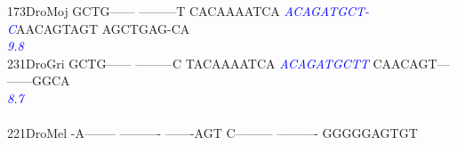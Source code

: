\documentclass[11pt,twoside,reqno,a4paper]{article}
\begin{document}
{173\hspace*{1\charwidth}DroMoj	GCTG------	---------T	CACAAAATCA	\textit{\textcolor{Blue}{A}}\textit{\textcolor{Blue}{C}}\textit{\textcolor{Blue}{A}}\textit{\textcolor{Blue}{G}}\textit{\textcolor{Blue}{A}}\textit{\textcolor{Blue}{T}}\textit{\textcolor{Blue}{G}}\textit{\textcolor{Blue}{C}}\textit{\textcolor{Blue}{T}}\textit{\textcolor{Blue}{-}}	\textit{\textcolor{Blue}{C}}AACAGTAGT	AGCTGAG-CA	\\
\hspace*{4\charwidth}\hspace*{7\charwidth}\hspace*{1\charwidth}\hspace*{1\charwidth}\hspace*{1\charwidth}\hspace*{30\charwidth}\textit{\textcolor{Blue}{9.8}}\hspace*{1\charwidth}\hspace*{1\charwidth}\hspace*{1\charwidth}\\
231\hspace*{1\charwidth}DroGri	GCTG------	---------C	TACAAAATCA	\textit{\textcolor{Blue}{A}}\textit{\textcolor{Blue}{C}}\textit{\textcolor{Blue}{A}}\textit{\textcolor{Blue}{G}}\textit{\textcolor{Blue}{A}}\textit{\textcolor{Blue}{T}}\textit{\textcolor{Blue}{G}}\textit{\textcolor{Blue}{C}}\textit{\textcolor{Blue}{T}}\textit{\textcolor{Blue}{T}}	CAACAGT---	------GGCA	\\
\hspace*{4\charwidth}\hspace*{7\charwidth}\hspace*{1\charwidth}\hspace*{1\charwidth}\hspace*{1\charwidth}\hspace*{30\charwidth}\textit{\textcolor{Blue}{8.7}}\hspace*{1\charwidth}\hspace*{1\charwidth}\hspace*{1\charwidth}\\
\\
221\hspace*{1\charwidth}DroMel	-A--------	----------	-------AGT	C---------	----------	GGGGGAGTGT	\\
\hspace*{4\charwidth}\hspace*{7\charwidth}\hspace*{1\charwidth}\hspace*{1\charwidth}\hspace*{1\charwidth}\hspace*{1\charwidth}\hspace*{1\charwidth}\hspace*{1\charwidth}\\
}
\end{document}
